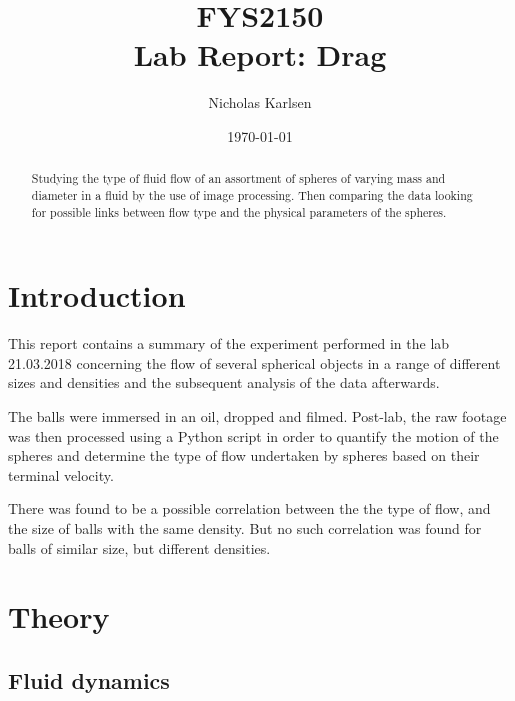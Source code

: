 \documentclass[11pt,a4paper]{article}
\begin{document}

\title{FYS2150 \\ Lab Report: Drag}%

\author{Nicholas Karlsen}

\date{\today}%

\maketitle

\begin{abstract}
  Studying the type of fluid flow of an assortment of spheres of varying mass and diameter in a fluid by the use of image processing. Then comparing the data looking for possible links between flow type and the physical parameters of the spheres.
\end{abstract}


\section{\label{sect:intro}Introduction}
  This report contains a summary of the experiment performed in the lab 21.03.2018 concerning the flow of several spherical objects in a range of different sizes and densities and the subsequent analysis of the data afterwards. 

  The balls were immersed in an oil, dropped and filmed. Post-lab, the raw footage was then processed using a Python script in order to quantify the motion of the spheres and determine the type of flow undertaken by spheres based on their terminal velocity. 

  There was found to be a possible correlation between the the type of flow, and the size of balls with the same density. But no such correlation was found for balls of similar size, but different densities.

\section{\label{sect:theory}Theory}

  \subsection{Fluid dynamics}
\end{document}
